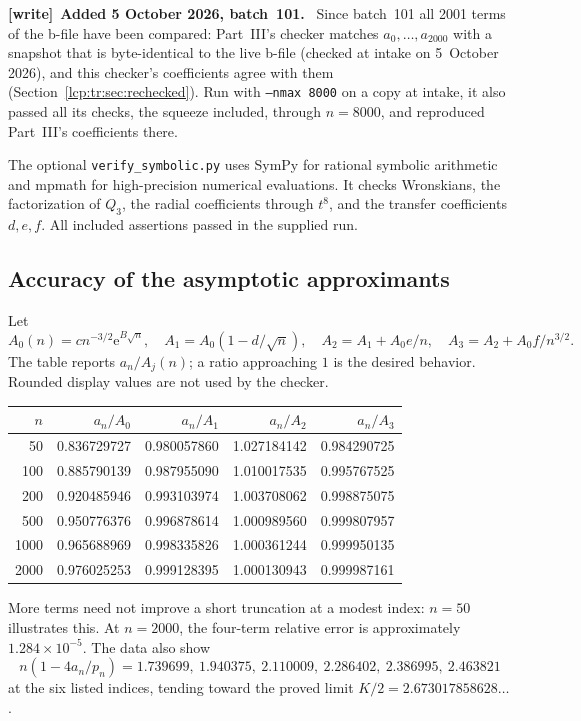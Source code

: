 \documentclass[11pt]{article}
\numberwithin{equation}{section}
\theoremstyle{definition}\newtheorem{definition}[theorem]{Definition}
\theoremstyle{remark}\newtheorem{remark}[theorem]{Remark}
\newcommand{\ee}{\mathrm e}
\newenvironment{writenote}[1][]{\par\smallskip\begingroup\small
 \noindent\textbf{[write]}\if\relax\detokenize{#1}\relax\else~\textbf{#1.}\fi\ }%
 {\par\endgroup\smallskip}
\begin{document}
\begin{writenote}[Added 5 October 2026, batch~101]
Since batch~101 all 2001 terms of the b-file have been compared: Part~III's
checker matches $a_0,\ldots,a_{2000}$ with a snapshot that is
byte-identical to the live b-file (checked at intake on 5~October 2026),
and this checker's coefficients agree with them
(Section~\ref{lcp:tr:sec:rechecked}). Run with \texttt{--nmax 8000} on a
copy at intake, it also passed all its checks, the squeeze included, through
$n=8000$, and reproduced Part~III's coefficients there.
\end{writenote}

The optional \texttt{verify\_symbolic.py} uses SymPy for rational symbolic
arithmetic and mpmath for high-precision numerical evaluations. It checks
Wronskians, the factorization of $Q_3$, the radial coefficients through
$t^8$, and the transfer coefficients $d,e,f$.
All included assertions passed in the supplied run.

\subsection{Accuracy of the asymptotic approximants}
Let
\[
 A_0(n)=cn^{-3/2}\ee^{B\sqrt n},\quad
 A_1=A_0(1-d/\sqrt n),\quad
 A_2=A_1+A_0e/n,\quad
 A_3=A_2+A_0f/n^{3/2}.
\]
The table reports $a_n/A_j(n)$; a ratio approaching $1$ is the desired
behavior. Rounded display values are not used by the checker.
\begin{center}
\begin{tabular}{r r r r r}
\toprule
$n$ & $a_n/A_0$ & $a_n/A_1$ & $a_n/A_2$ & $a_n/A_3$\\
\midrule
50   & 0.836729727 & 0.980057860 & 1.027184142 & 0.984290725\\
100  & 0.885790139 & 0.987955090 & 1.010017535 & 0.995767525\\
200  & 0.920485946 & 0.993103974 & 1.003708062 & 0.998875075\\
500  & 0.950776376 & 0.996878614 & 1.000989560 & 0.999807957\\
1000 & 0.965688969 & 0.998335826 & 1.000361244 & 0.999950135\\
2000 & 0.976025253 & 0.999128395 & 1.000130943 & 0.999987161\\
\bottomrule
\end{tabular}
\end{center}
More terms need not improve a short truncation at a modest index:
$n=50$ illustrates this. At $n=2000$, the four-term relative error is
approximately $1.284\times10^{-5}$.
The data also show
\[
 n(1-4a_n/p_n)=
 1.739699,\ 1.940375,\ 2.110009,\ 2.286402,\ 2.386995,\ 2.463821
\]
at the six listed indices, tending toward the proved limit
$K/2=2.673017858628\ldots$.
\end{document}
